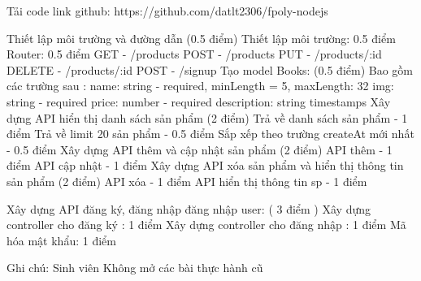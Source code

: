 Tải code link github: https://github.com/datlt2306/fpoly-nodejs

Thiết lập môi trường và đường dẫn (0.5 điểm)
Thiết lập môi trường: 0.5 điểm
Router: 0.5 điểm
 GET - /products
 POST - /products
 PUT - /products/:id
 DELETE - /products/:id
 POST - /signup
Tạo model Books: (0.5 điểm)
Bao gồm các trường sau :
 name: string - required, minLength = 5, maxLength: 32
 img: string - required
 price: number - required
 description: string
 timestamps
Xây dựng API hiển thị danh sách sản phẩm (2 điểm)
Trả về danh sách sản phẩm - 1 điểm
Trả về limit 20 sản phẩm - 0.5 điểm
Sắp xếp theo trường createAt mới nhất - 0.5 điểm
Xây dựng API thêm và cập nhật sản phẩm (2 điểm)
API thêm - 1 điểm
API cập nhật - 1 điểm 
Xây dựng API xóa sản phẩm và hiển thị thông tin sản phẩm (2 điểm)
API xóa  - 1 điểm
API hiển thị thông tin sp - 1 điểm 

Xây dựng API đăng ký, đăng nhập đăng nhập user: ( 3 điểm )
Xây dựng controller cho đăng ký : 1 điểm
Xây dựng controller cho đăng nhập : 1 điểm
Mã hóa mật khẩu: 1 điểm


Ghi chú: Sinh viên Không mở các bài thực hành cũ